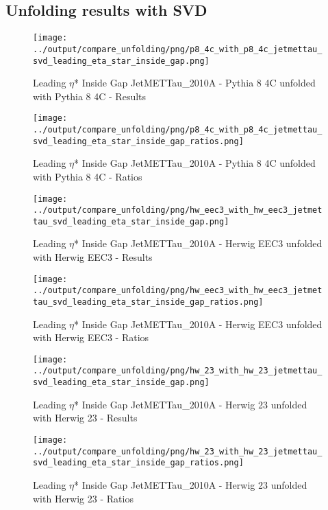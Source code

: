\documentclass[11pt]{book}
\begin{document}
\clearpage
\subsection{Unfolding results with SVD}

\begin{figure}[ht]
\centering
\texttt{[image: ../output/compare\_unfolding/png/p8\_4c\_with\_p8\_4c\_jetmettau\_svd\_leading\_eta\_star\_inside\_gap.png]}
\caption{Leading $\eta$* Inside Gap JetMETTau\_2010A - Pythia 8 4C unfolded with Pythia 8 4C - Results}
\label{p8_p8_jetmettau_svd_leading_eta_star_inside_gap_a}
\end{figure}

\begin{figure}[ht]
\centering
\texttt{[image: ../output/compare\_unfolding/png/p8\_4c\_with\_p8\_4c\_jetmettau\_svd\_leading\_eta\_star\_inside\_gap\_ratios.png]}
\caption{Leading $\eta$* Inside Gap JetMETTau\_2010A - Pythia 8 4C unfolded with Pythia 8 4C - Ratios}
\label{p8_p8_jetmettau_svd_leading_eta_star_inside_gap_b}
\end{figure}

\begin{figure}[ht]
\centering
\texttt{[image: ../output/compare\_unfolding/png/hw\_eec3\_with\_hw\_eec3\_jetmettau\_svd\_leading\_eta\_star\_inside\_gap.png]}
\caption{Leading $\eta$* Inside Gap JetMETTau\_2010A - Herwig EEC3 unfolded with Herwig EEC3 - Results}
\label{hw_eec3_hw_eec3_jetmettau_svd_leading_eta_star_inside_gap_a}
\end{figure}

\begin{figure}[ht]
\centering
\texttt{[image: ../output/compare\_unfolding/png/hw\_eec3\_with\_hw\_eec3\_jetmettau\_svd\_leading\_eta\_star\_inside\_gap\_ratios.png]}
\caption{Leading $\eta$* Inside Gap JetMETTau\_2010A - Herwig EEC3 unfolded with Herwig EEC3 - Ratios}
\label{hw_eec3_hw_eec3_jetmettau_svd_leading_eta_star_inside_gap_b}
\end{figure}

\begin{figure}[ht]
\centering
\texttt{[image: ../output/compare\_unfolding/png/hw\_23\_with\_hw\_23\_jetmettau\_svd\_leading\_eta\_star\_inside\_gap.png]}
\caption{Leading $\eta$* Inside Gap JetMETTau\_2010A - Herwig 23 unfolded with Herwig 23 - Results}
\label{hw_23_hw_23_jetmettau_svd_leading_eta_star_inside_gap_a}
\end{figure}

\begin{figure}[ht]
\centering
\texttt{[image: ../output/compare\_unfolding/png/hw\_23\_with\_hw\_23\_jetmettau\_svd\_leading\_eta\_star\_inside\_gap\_ratios.png]}
\caption{Leading $\eta$* Inside Gap JetMETTau\_2010A - Herwig 23 unfolded with Herwig 23 - Ratios}
\label{hw_23_hw_23_jetmettau_svd_leading_eta_star_inside_gap_b}
\end{figure}
\end{document}
